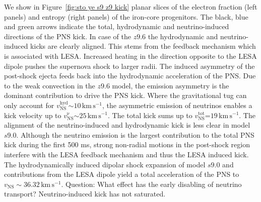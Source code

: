 \documentclass[fleqn,usenatbib]{mnras}
\newcommand{\kms}{\ensuremath{\mathrm{km\, s^{-1}}}}
\newcommand{\COM}[1]{{\color{orange}#1}}
\begin{document}
We show in Figure~\ref{fig:sto ye s9 z9 kick} planar slices of the electron fraction (left panels) and entropy (right panels) of the iron-core progenitors. The black, blue and green arrows indicate the total, hydrodynamic and neutrino-induced directions of the PNS kick. In case of the $z9.6$ the hydrodynamic and neutrino-induced kicks are clearly aligned. This stems from the feedback mechanism which is associated with LESA. Increased heating in the direction opposite to the LESA dipole pushes the supernova shock to larger radii. The induced asymmetry of the post-shock ejecta feeds back into the hydrodynamic acceleration of the PNS. Due to the weak convection in the $z9.6$ model, the emission asymmetry is the dominant contribution to drive the PNS kick. 
Where the gravitational tug can only account for  $v_{\mathrm{NS}}^{\mathrm{hyd}}\mathord{\sim}10\,\kms$, the asymmetric emission of neutrinos enables a kick velocity up to $v_{\mathrm{NS}}^{\mathrm{\nu}}\mathord{\sim}25\,\kms$. The total kick sums up to $v_{\mathrm{NS}}^{\mathrm{tot}}\mathord{=}19\,\kms$.
The alignment of the neutrino-induced and hydrodynamic kick is less clear in model $s9.0$. Although the neutrino emission is the largest contribution to the total PNS kick during the first 500 ms, strong non-radial motions in the post-shock region interfere with the LESA feedback mechanism and thus the LESA induced kick. 
The hydrodynamically induced dipolar shock expansion of model $s9.0$ and contributions from the LESA dipole yield a total acceleration of the PNS to $v_{\mathrm{NS}}\mathrm{\sim}36.32\,\kms$.
\COM{Question: What effect has the early disabling of neutrino transport? Neutrino-induced kick has not saturated. }
\end{document}
